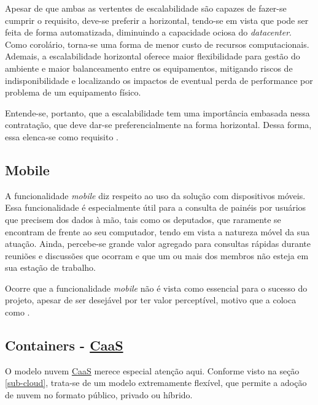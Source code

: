 Apesar de que ambas as vertentes de escalabilidade são capazes de fazer-se cumprir o requisito, deve-se preferir a horizontal, tendo-se em vista que pode ser feita de forma automatizada, diminuindo a capacidade ociosa do \emph{datacenter}. Como corolário, torna-se uma forma de menor custo de recursos computacionais. Ademais, a escalabilidade horizontal oferece maior flexibilidade para gestão do ambiente e maior balanceamento entre os equipamentos, mitigando riscos de indisponibilidade e localizando os impactos de eventual perda de performance por problema de um equipamento físico.

Entende-se, portanto, que a escalabilidade tem uma importância embasada nessa contratação, que deve dar-se preferencialmente na forma horizontal. Dessa forma, essa elenca-se como requisito \SHOULD.


\subsection{Mobile}

A funcionalidade \emph{mobile} diz respeito ao uso da solução com dispositivos móveis. Essa funcionalidade é especialmente útil para a consulta de painéis por usuários que precisem dos dados à mão, tais como os deputados, que raramente se encontram de frente ao seu computador, tendo em vista a natureza móvel da sua atuação. Ainda, percebe-se grande valor agregado para consultas rápidas durante reuniões e discussões que ocorram e que um ou mais dos membros não esteja em sua estação de trabalho.

Ocorre que a funcionalidade \emph{mobile} não é vista como essencial para o sucesso do projeto, apesar de ser desejável por ter valor perceptível, motivo que a coloca como \SHOULD.


\subsection{Containers - \hyperref[caas]{CaaS}}

O modelo nuvem \hyperref[caas]{CaaS} merece especial atenção aqui. Conforme visto na seção \ref{sub-cloud}, trata-se de um modelo extremamente flexível, que permite a adoção de nuvem no formato público, privado ou híbrido.

